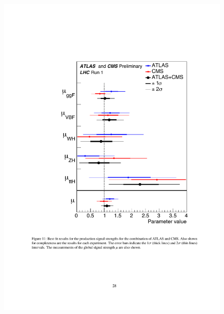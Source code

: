 \begin{figure}[hbtp]
  \begin{center}
    \includegraphics[width=\cmsFigWidth]{figures/Higgsproperties-xsec}

\end{center}
\end{figure}
